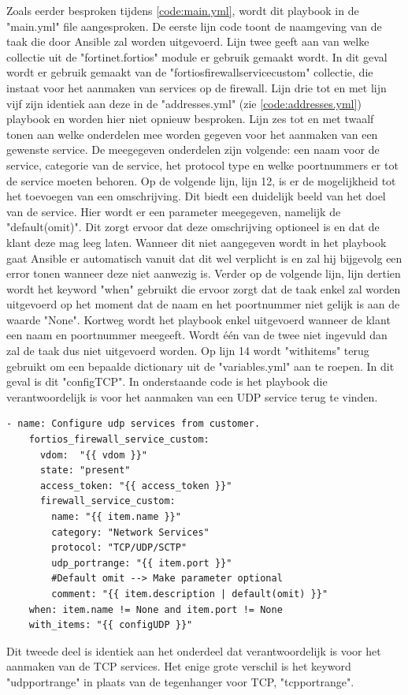 Zoals eerder besproken tijdens \ref{code:main.yml}, wordt dit playbook in de "main.yml" file  aangesproken. De eerste lijn code toont de naamgeving van de taak die door Ansible zal worden uitgevoerd. Lijn twee geeft aan van welke collectie uit de "fortinet.fortios" module er gebruik gemaakt wordt. In dit geval wordt er gebruik gemaakt van de "fortios\textunderscore firewall\textunderscore service\textunderscore custom" collectie, die instaat voor het aanmaken van services op de firewall. Lijn drie tot en met lijn vijf zijn identiek aan deze in de "addresses.yml"  (zie \ref{code:addresses.yml}) playbook en worden hier niet opnieuw besproken. Lijn zes tot en met twaalf tonen aan welke onderdelen mee worden gegeven voor het aanmaken van een gewenste service. De meegegeven onderdelen zijn volgende: een naam voor de service, categorie van de service, het protocol type en welke poortnummers er tot de service moeten behoren. Op de volgende lijn, lijn 12, is er de mogelijkheid tot het toevoegen van een omschrijving. Dit biedt een duidelijk beeld van het doel van de service. Hier wordt er een parameter meegegeven, namelijk de "default(omit)". Dit zorgt ervoor dat deze omschrijving optioneel is en dat de klant deze mag leeg laten. Wanneer dit niet aangegeven wordt in het playbook gaat Ansible er automatisch vanuit dat dit wel verplicht is en zal hij bijgevolg een error tonen wanneer deze niet aanwezig is. Verder op de volgende lijn, lijn dertien wordt het keyword "when" gebruikt die ervoor zorgt dat de taak enkel zal worden uitgevoerd op het moment dat de naam en het poortnummer niet gelijk is aan de waarde "None". Kortweg wordt het playbook enkel uitgevoerd wanneer de klant een naam en poortnummer meegeeft. Wordt één van de twee niet ingevuld dan zal de taak dus niet uitgevoerd worden. Op lijn 14 wordt "with\textunderscore items" terug gebruikt om een bepaalde dictionary uit de "variables.yml" aan te roepen. In dit geval is dit "configTCP". 
\newline
In onderstaande code is het playbook die verantwoordelijk is voor het aanmaken van een UDP service terug te vinden. 

\begin{lstlisting}[caption={Playbook services, task UDP}, label={lst:CodeUDP}]
    - name: Configure udp services from customer.
    fortios_firewall_service_custom:
      vdom:  "{{ vdom }}"
      state: "present"
      access_token: "{{ access_token }}"
      firewall_service_custom:
        name: "{{ item.name }}"
        category: "Network Services"
        protocol: "TCP/UDP/SCTP"
        udp_portrange: "{{ item.port }}" 
        #Default omit --> Make parameter optional
        comment: "{{ item.description | default(omit) }}"
    when: item.name != None and item.port != None
    with_items: "{{ configUDP }}"
\end{lstlisting}
Dit tweede deel is identiek aan het onderdeel dat verantwoordelijk is voor het aanmaken van de TCP services. Het enige grote verschil is het keyword "udp\textunderscore portrange" in plaats van de tegenhanger voor TCP, "tcp\textunderscore portrange". 

